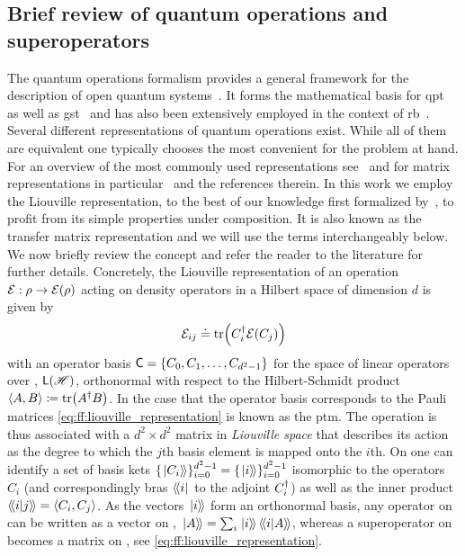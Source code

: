 \subsection{Brief review of quantum operations and superoperators}\label{subsec:ff:theory:quantum_operations}
The quantum operations formalism provides a general framework for the description of open quantum systems~\cite{Kraus1983,Nielsen2011}.
It forms the mathematical basis for \gls{qpt}~\cite{Chuang1997,Poyatos1997} as well as \gls{gst}~\cite{Blume-Kohout2013,Greenbaum2015} and has also been extensively employed in the context of \gls{rb}~\cite{Magesan2011,Kimmel2014}.
Several different representations of quantum operations exist.
While all of them are equivalent one typically chooses the most convenient for the problem at hand.
For an overview of the most commonly used representations see~ and for matrix representations in particular~ and the references therein.
In this work we employ the Liouville representation, to the best of our knowledge first formalized by~\textcite{Fano1957}, to profit from its simple properties under composition.
It is also known as the transfer matrix representation and we will use the terms interchangeably below.
We now briefly review the concept and refer the reader to the literature for further details.
Concretely, the Liouville representation of an operation $\mathcal{E}: \rho\rightarrow\mathcal{E}(\rho)$ acting on density operators in a Hilbert space \Hspace of dimension $d$ is given by
\begin{equation}\label{eq:ff:liouville_representation}
    \mathcal{E}_{ij}\doteq\tr(C_i^\dagger\mathcal{E}(C_j))
\end{equation}
with an operator basis $\mathsf{C}=\lbrace C_0, C_1, \dotsc, C_{d^2-1}\rbrace$ for the space of linear operators over \Hspace, $\mathsf{L}(\mathscr{H})$, orthonormal with respect to the Hilbert-Schmidt product $\expval{A,B}\coloneqq\tr(A^\dagger B)$.
In the case that the operator basis corresponds to the Pauli matrices \cref{eq:ff:liouville_representation} is known as the \gls{ptm}.
The operation \qp is thus associated with a $d^2\times d^2$ matrix in \emph{Liouville space} \Lspace that describes its action as the degree to which the $j$th basis element is mapped onto the $i$th.
On \Lspace one can identify a set of basis kets $\lbrace\dket{C_i}\rbrace_{i=0}^{d^2-1} = \lbrace\dket{i}\rbrace_{i=0}^{d^2-1}$ isomorphic to the operators $C_i$ (and correspondingly bras $\dbra{i}$ to the adjoint $C_i^\dagger$) as well as the inner product $\dip{i}{j} = \dotHS{C_i}{C_j}$.
As the vectors $\dket{i}$ form an orthonormal basis, any operator on \Hspace can be written as a vector on \Lspace, $\dket{A} = \sum_i\dket{i}\dip{i}{A}$, whereas a superoperator on \Hspace becomes a matrix on \Lspace, see \cref{eq:ff:liouville_representation}.
